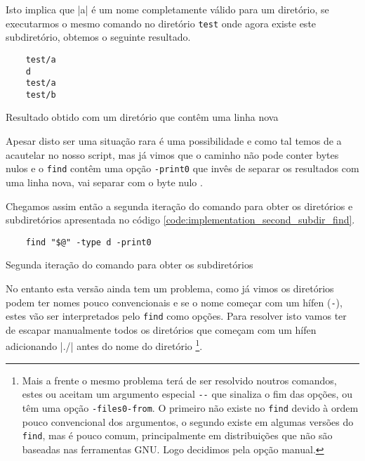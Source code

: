 Isto implica que \bashinline|a\nd| é um nome completamente válido para um diretório,
se executarmos o mesmo comando no diretório \Verb|test| onde agora existe este
subdiretório, obtemos o seguinte resultado.

\begin{listing}[H]
	\centering
	\begin{verbatim}
    test/a
    d
    test/a
    test/b
  \end{verbatim}
	\caption{Resultado obtido com um diretório que contêm uma linha nova}
\end{listing}

Apesar disto ser uma situação rara é uma possibilidade e como tal temos de a
acautelar no nosso script, mas já vimos que o caminho não pode conter bytes
nulos e o \Verb|find| contêm uma opção \Verb|-print0| que invês de separar os
resultados com uma linha nova, vai separar com o byte nulo \cite{find_man}.

Chegamos assim então a segunda iteração do comando para obter os diretórios e
subdiretórios apresentada no código \ref{code:implementation_second_subdir_find}.

\begin{listing}[H]
	\centering
	\begin{verbatim}
    find "$@" -type d -print0
  \end{verbatim}
	\caption{Segunda iteração do comando para obter os subdiretórios}
	\label{code:implementation_second_subdir_find}
\end{listing}

No entanto esta versão ainda tem um problema, como já vimos os diretórios podem
ter nomes pouco convencionais e se o nome começar com um hífen (\Verb|-|),
estes vão ser interpretados pelo \Verb|find| como opções. Para resolver isto
vamos ter de escapar manualmente todos os diretórios que começam com um hífen
adicionando \bashinline|./| antes do nome do diretório
\footnote{Mais a frente o mesmo problema terá de ser resolvido noutros comandos,
	estes ou aceitam um argumento especial \Verb|--| que sinaliza o fim das opções,
	ou têm uma opção \Verb|-files0-from|. O primeiro não existe no \Verb|find|
	devido à ordem pouco convencional dos argumentos, o segundo existe em algumas
	versões do \Verb|find|, mas é pouco comum, principalmente em distribuições que
	não são baseadas nas ferramentas GNU. Logo decidimos pela opção manual.}.

